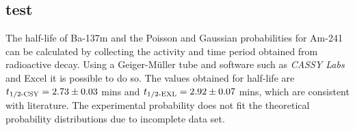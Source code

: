 \documentclass{article}
\begin{document}
\textheight=24.75cm

\begin{multicols*}{2}

\section{test}
The half-life of Ba-137m and the Poisson and Gaussian probabilities for Am-241 can be calculated by collecting the activity and time period obtained from radioactive decay. Using a Geiger-M\"{u}ller tube and software such as \textit{CASSY Labs} and Excel it is possible to do so. The values obtained for half-life are $t\textsubscript{1/2-CSY}=2.73\pm0.03$ mins and $t\textsubscript{1/2-EXL}=2.92\pm0.07$ mins, which are consistent with literature. The experimental probability does not fit the theoretical probability distributions due to incomplete data set.
\end{multicols*}
\end{document}
